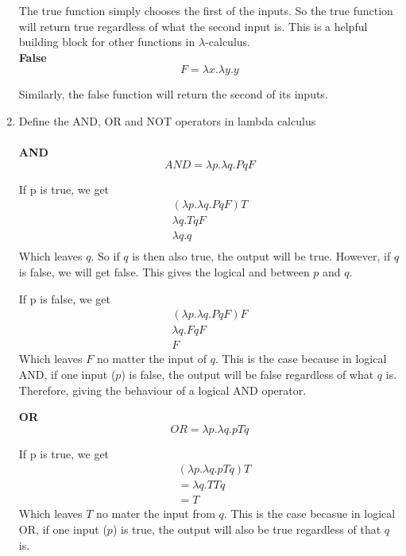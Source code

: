 \documentclass{article}
\begin{document}
\begin{enumerate}
    The true function simply chooses the first of the inputs. So the true function will return true regardless of what the second input is. This is a helpful building block for other functions in \(\lambda\)-calculus.\\
    
    \Large \textbf{False}\\
    \normalsize
    \[F = \lambda x.\lambda y.y\]

    Similarly, the false function will return the second of its inputs.\\
    \color{black}
    \item Define the AND, OR and NOT operators in lambda calculus\\
    \\
    \color{blue}
    \Large \textbf{AND}\\
    \normalsize
    \[AND = \lambda p.\lambda q.PqF\]

    If p is true, we get
    \begin{align}
        (\lambda p.\lambda q.PqF)T \\
        \lambda q.TqF \\
        \lambda q.q \\
    \end{align}
    Which leaves \(q\). So if \(q\) is then also true, the output will be true. However, if \(q\) is false, we will get false. This gives the logical and between \(p\) and \(q\).
    
    If p is false, we get
    \begin{align}
        (\lambda p.\lambda q.PqF)F \\
        \lambda q.FqF \\
        F
    \end{align}
    Which leaves \(F\) no matter the input of \(q\). This is the case because in logical AND, if one input (\(p\)) is false, the output will be false regardless of what \(q\) is. Therefore, giving the behaviour of a logical AND operator.
    
    \bigskip
    \newpage
    \Large \textbf{OR}\\
    \normalsize
    \[OR = \lambda p.\lambda q.pTq\]

    If p is true, we get\begin{align}
        &(\lambda p.\lambda q.pTq)T \\
        &=\lambda q.TTq \\
        &=T
    \end{align}
    Which leaves \(T\) no mater the input from \(q\). This is the case becasue in logical OR, if one input (\(p\)) is true, the output will also be true regardless of that \(q\) is.
    

\end{enumerate}
\end{document}
